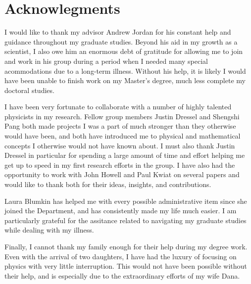\chapter*{Acknowlegments}

I would like to thank my advisor Andrew Jordan for his constant help and guidance throughout my graduate studies.  Beyond his aid in my growth as a scientist, I also owe him an enormous debt of gratitude for allowing me to join and work in his group during a period when I needed many special acommodations due to a long-term illness.  Without his help, it is likely I would have been unable to finish work on my Master's degree, much less complete my doctoral studies.

I have been very fortunate to collaborate with a number of highly talented physicists in my research.  Fellow group members Justin Dressel and Shengshi Pang both made projects I was a part of much stronger than they otherwise would have been, and both have introduced me to physical and mathematical concepts I otherwise would not have known about.  I must also thank Justin Dressel in particular for spending a large amount of time and effort helping me get up to speed in my first research efforts in the group.  I have also had the opportunity to work with John Howell and Paul Kwiat on several papers and would like to thank both for their ideas, insights, and contributions.

Laura Blumkin has helped me with every possible administrative item since she joined the Department, and has consistently made my life much easier.  I am particularly grateful for the assitance related to navigating my graduate studies while dealing with my illness.

Finally, I cannot thank my family enough for their help during my degree work. Even with the arrival of two daughters, I have had the luxury of focusing on physics with very little interruption.  This would not have been possible without their help, and is especially due to the extraordinary efforts of my wife Dana. 

